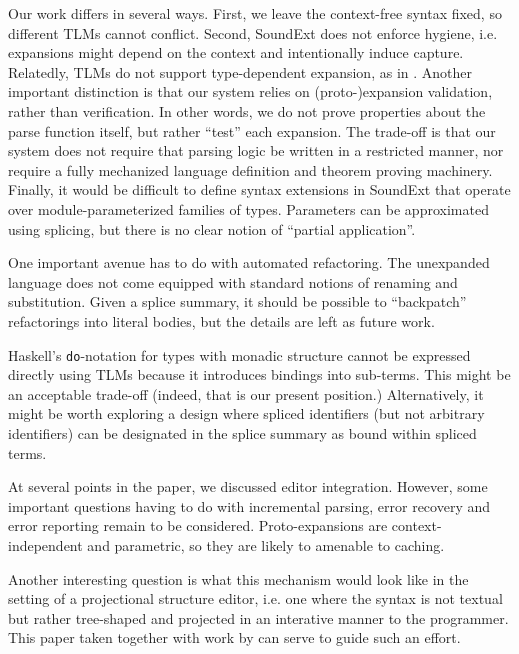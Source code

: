 \documentclass[acmsmall,10pt,review,anonymous]{acmart}\settopmatter{printfolios=true}
\newcommand{\li}[1]{\lstinline{#1}}
\begin{document}
Our work differs in several ways. First, we leave the context-free syntax fixed, so different TLMs cannot conflict. Second, SoundExt does not enforce hygiene, i.e. expansions might depend on the context and intentionally induce capture. Relatedly, TLMs do not support type-dependent expansion, as in \cite{conf/popl/LorenzenE16}. Another important distinction is that our system relies on (proto-)expansion validation, rather than verification. In other words, we do not prove properties about the parse function itself, but rather ``test'' each expansion. The trade-off is that our system does not require that parsing logic be written in a restricted manner, nor require a fully mechanized language definition and theorem proving machinery. Finally, it would be difficult to define syntax extensions in SoundExt that operate over module-parameterized families of types. Parameters can be approximated using splicing, but there is no clear notion of ``partial application''.


One important avenue has to do with automated refactoring. The unexpanded language does not come equipped with standard notions of renaming and substitution. Given a splice summary, it should be possible to ``backpatch'' refactorings into literal bodies, but the details are left as future work.

Haskell's \li{do}-notation for types with monadic structure cannot be expressed directly using TLMs because it introduces bindings into sub-terms. This might be an acceptable trade-off (indeed, that is our present position.) Alternatively, it might be worth exploring a design where spliced identifiers (but not arbitrary identifiers) can be designated in the splice summary as bound within spliced terms.

At several points in the paper, we discussed editor integration. However, some important questions having to do with incremental parsing, error recovery and error reporting remain to be considered. Proto-expansions are context-independent and parametric, so they are likely to amenable to caching.

Another interesting question is what this mechanism would look like in the setting of a projectional structure editor, i.e. one where the syntax is not textual but rather tree-shaped and projected in an interative manner to the programmer. This paper taken together with work by \citet{Omar:2012:ACC:2337223.2337324,DBLP:conf/popl/OmarVHAH17} can serve to guide such an effort.
\end{document}
